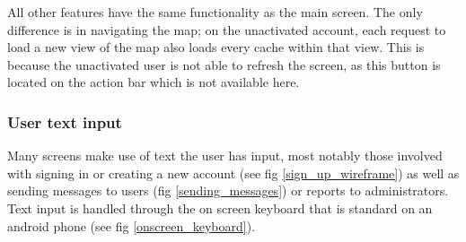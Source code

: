 All other features have the same functionality as the main screen. The only difference is in navigating the map; on the unactivated account, each request to load a new view of the map also loads every cache within that view. This is because the unactivated user is not able to refresh the screen, as this button is located on the action bar which is not available here.

\subsubsection{User text input}

Many screens make use of text the user has input, most notably those involved with signing in or creating a new account (see fig \ref{sign_up_wireframe}) as well as sending messages to users (fig \ref{sending_messages}) or reports to administrators. Text input is handled through the on screen keyboard that is standard on an android phone (see fig \ref{onscreen_keyboard}). 
\vspace{0pt}
